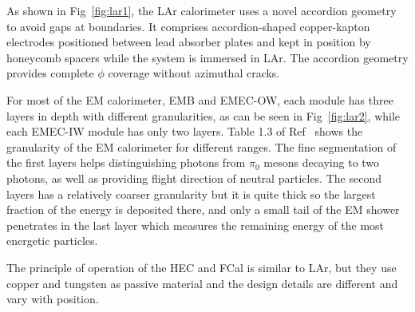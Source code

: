 \par As shown in Fig~\ref{fig:lar1}, the LAr calorimeter uses a novel accordion geometry to avoid gaps at boundaries. It comprises accordion-shaped 
copper-kapton electrodes positioned between lead absorber plates and kept in position by honeycomb spacers while the system is immersed in LAr. 
The accordion geometry provides complete $\phi$ coverage without azimuthal cracks.
\par For most of the EM calorimeter, EMB and EMEC-OW, each module has three layers in depth with different granularities, 
as can be seen in Fig~\ref{fig:lar2}, while each EMEC-IW module has only two layers. Table 1.3 of Ref~\cite{Aad:1129811} 
shows the granularity of the EM calorimeter for different ranges. 
The fine segmentation of the first layers helps distinguishing photons from $\pi_0$ 
mesons decaying to two photons, as well as providing flight direction of neutral particles. The second layers has a relatively
coarser granularity but it is quite thick so the largest fraction of the energy is deposited there, and only a small tail of the EM shower penetrates in the last layer which measures the remaining energy of the most energetic particles.

\par The principle of operation of the HEC and FCal is similar to LAr, but they use copper and tungsten as passive material and the design details are different and vary with position.



